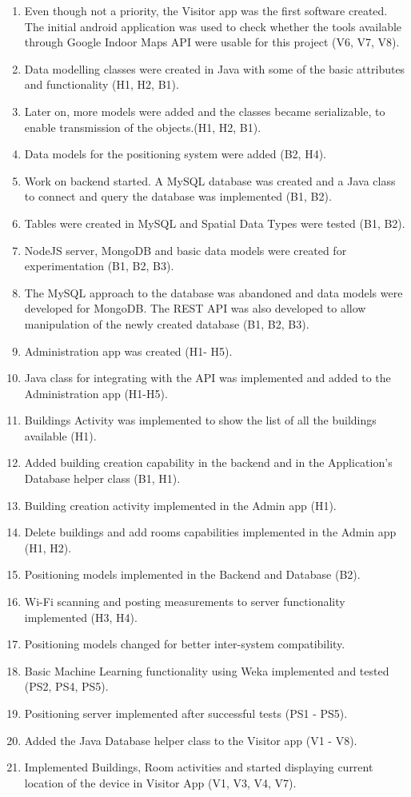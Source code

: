 \begin{enumerate}
	\item Even though not a priority, the Visitor app was the first software created. The initial android application was used to check whether the tools available through Google Indoor Maps API were usable for this project (V6, V7, V8).
	\item Data modelling classes were created in Java with some of the basic attributes and functionality (H1, H2, B1).
	\item Later on, more models were added and the classes became serializable, to enable transmission of the objects.(H1, H2, B1).
	\item Data models for the positioning system were added (B2, H4).
	\item Work on backend started. A MySQL database was created and a Java class to connect and query the database was implemented (B1, B2).
	\item Tables were created in MySQL and Spatial Data Types were tested (B1, B2).
	\item NodeJS server, MongoDB and basic data models were created for experimentation (B1, B2, B3).
	\item The MySQL approach to the database was abandoned and data models were developed for MongoDB. The REST API was also developed to allow manipulation of the newly created database (B1, B2, B3).
	\item  Administration app was created (H1- H5).
	\item Java class for integrating with the API was implemented and added to the Administration app (H1-H5).
	\item Buildings Activity was implemented to show the list of all the buildings available (H1).
	\item Added building creation capability in the backend and in the Application's Database helper class (B1, H1).
	\item Building creation activity implemented in the Admin app (H1).
	\item Delete buildings and add rooms capabilities implemented in the Admin app (H1, H2).
	\item Positioning models implemented in the Backend and Database (B2).
	\item Wi-Fi scanning and posting measurements to server functionality implemented (H3, H4). 
	\item Positioning models changed for better inter-system compatibility.
	\item Basic Machine Learning functionality using Weka implemented and tested (PS2, PS4, PS5).
	\item Positioning server implemented after successful tests (PS1 - PS5).
	\item Added the Java Database helper class to the Visitor app (V1 - V8).
	\item Implemented Buildings, Room activities and started displaying current location of the device in Visitor App (V1, V3, V4, V7).	
\end{enumerate}
